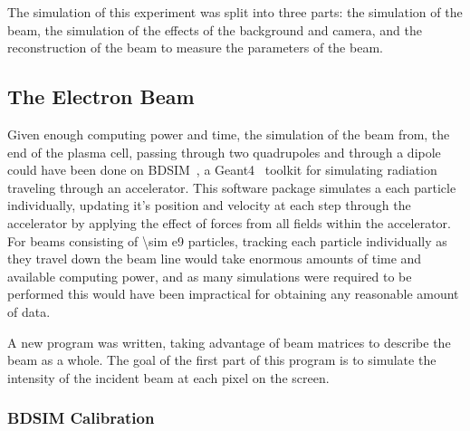 The simulation of this experiment was split into three parts: the simulation of
the beam, the simulation of the effects of the background and camera, and the
reconstruction of the beam to measure the parameters of the beam.

\subsection{The Electron Beam}

Given enough computing power and time, the simulation of the beam from, the end
of the plasma cell, passing through two quadrupoles and through a dipole could
have been done on BDSIM~\cite{agapov2009bdsim}, a
Geant4~\cite{agostinelli2003geant4} toolkit for simulating radiation traveling
through an accelerator. This software package simulates a each particle
individually, updating it's position and velocity at each step through the
accelerator by applying the effect of forces from all fields within the
accelerator.  For beams consisting of \num{\sim e9} particles, tracking each
particle individually as they travel down the beam line would take enormous
amounts of time and available computing power, and as many simulations were
required to be performed this would have been impractical for obtaining any
reasonable amount of data.

A new program was written, taking advantage of beam matrices to describe the
beam as a whole. The goal of the first part of this program is to simulate the
intensity of the incident beam at each pixel on the screen.

\subsubsection{BDSIM Calibration}

